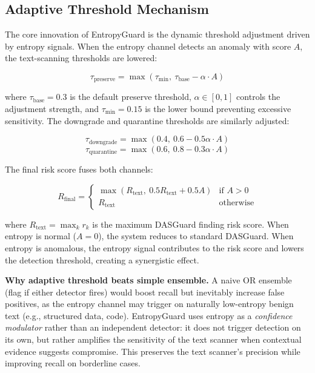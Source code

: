 \documentclass[conference]{IEEEtran}
\begin{document}
\subsection{Adaptive Threshold Mechanism}
\label{sec:fusion}

The core innovation of EntropyGuard is the dynamic threshold adjustment driven by entropy signals. When the entropy channel detects an anomaly with score $A$, the text-scanning thresholds are lowered:

\begin{equation}
\tau_{\text{preserve}} = \max\left(\tau_{\min},\ \tau_{\text{base}} - \alpha \cdot A\right)
\label{eq:threshold}
\end{equation}

where $\tau_{\text{base}} = 0.3$ is the default preserve threshold, $\alpha \in [0, 1]$ controls the adjustment strength, and $\tau_{\min} = 0.15$ is the lower bound preventing excessive sensitivity. The downgrade and quarantine thresholds are similarly adjusted:

\begin{equation}
\tau_{\text{downgrade}} = \max(0.4,\ 0.6 - 0.5\alpha \cdot A)
\end{equation}
\begin{equation}
\tau_{\text{quarantine}} = \max(0.6,\ 0.8 - 0.3\alpha \cdot A)
\end{equation}

The final risk score fuses both channels:

\begin{equation}
R_{\text{final}} = \begin{cases}
\max(R_{\text{text}},\ 0.5 R_{\text{text}} + 0.5 A) & \text{if } A > 0 \\
R_{\text{text}} & \text{otherwise}
\end{cases}
\label{eq:fusion}
\end{equation}

where $R_{\text{text}} = \max_k r_k$ is the maximum DASGuard finding risk score. When entropy is normal ($A=0$), the system reduces to standard DASGuard. When entropy is anomalous, the entropy signal contributes to the risk score and lowers the detection threshold, creating a synergistic effect.

\textbf{Why adaptive threshold beats simple ensemble.} A naive OR ensemble (flag if either detector fires) would boost recall but inevitably increase false positives, as the entropy channel may trigger on naturally low-entropy benign text (e.g., structured data, code). EntropyGuard uses entropy as a \emph{confidence modulator} rather than an independent detector: it does not trigger detection on its own, but rather amplifies the sensitivity of the text scanner when contextual evidence suggests compromise. This preserves the text scanner's precision while improving recall on borderline cases.
\end{document}
